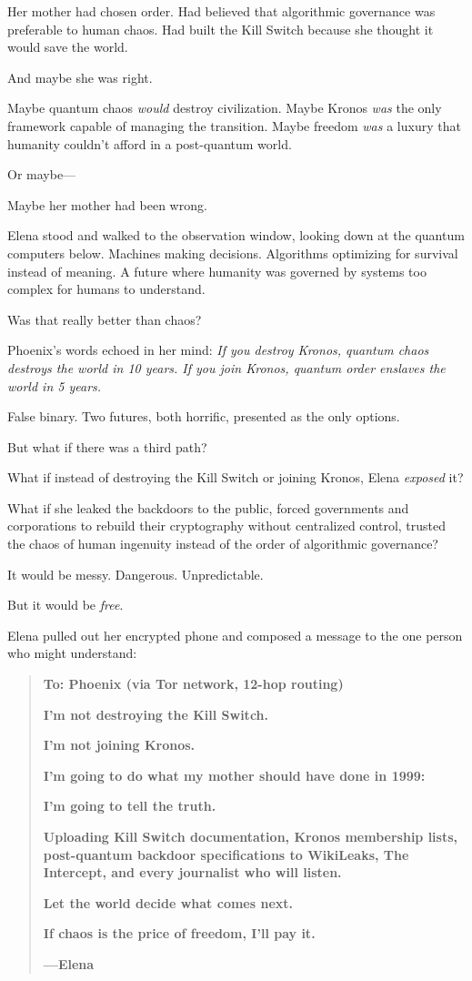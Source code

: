 Her mother had chosen order. Had believed that algorithmic governance was preferable to human chaos. Had built the Kill Switch because she thought it would save the world.

And maybe she was right.

Maybe quantum chaos \emph{would} destroy civilization. Maybe Kronos \emph{was} the only framework capable of managing the transition. Maybe freedom \emph{was} a luxury that humanity couldn't afford in a post-quantum world.

Or maybe---

Maybe her mother had been wrong.

Elena stood and walked to the observation window, looking down at the quantum computers below. Machines making decisions. Algorithms optimizing for survival instead of meaning. A future where humanity was governed by systems too complex for humans to understand.

Was that really better than chaos?

Phoenix's words echoed in her mind: \emph{If you destroy Kronos, quantum chaos destroys the world in 10 years. If you join Kronos, quantum order enslaves the world in 5 years.}

False binary. Two futures, both horrific, presented as the only options.

But what if there was a third path?

What if instead of destroying the Kill Switch or joining Kronos, Elena \emph{exposed} it?

What if she leaked the backdoors to the public, forced governments and corporations to rebuild their cryptography without centralized control, trusted the chaos of human ingenuity instead of the order of algorithmic governance?

It would be messy. Dangerous. Unpredictable.

But it would be \emph{free}.

Elena pulled out her encrypted phone and composed a message to the one person who might understand:

\begin{quote}
\textbf{To: Phoenix (via Tor network, 12-hop routing)}

\textbf{I'm not destroying the Kill Switch.}

\textbf{I'm not joining Kronos.}

\textbf{I'm going to do what my mother should have done in 1999:}

\textbf{I'm going to tell the truth.}

\textbf{Uploading Kill Switch documentation, Kronos membership lists, post-quantum backdoor specifications to WikiLeaks, The Intercept, and every journalist who will listen.}

\textbf{Let the world decide what comes next.}

\textbf{If chaos is the price of freedom, I'll pay it.}

\textbf{---Elena}
\end{quote}


